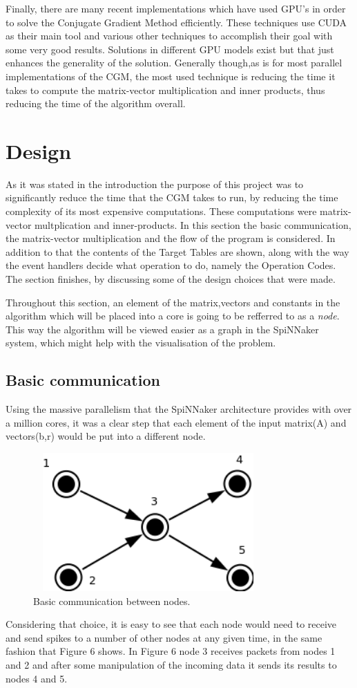 \documentclass[12pt,a4paper]{article}
\begin{document}
Finally, there are many recent implementations which have used GPU's in order to solve the Conjugate Gradient Method efficiently. These techniques use CUDA as their main tool and various other techniques to accomplish their goal with some very good results. Solutions in different GPU models exist but that just enhances the generality of the solution. Generally though,as is for most parallel implementations of the CGM, the most used technique is reducing the time it takes to compute the matrix-vector multiplication and inner products, thus reducing the time of the algorithm overall\cite{galiano2012gpu}\cite{wozniak2010parallel}.
\section{Design}
As it was stated in the introduction the purpose of this project was to significantly reduce the time that the CGM takes to run, by reducing the time complexity of its most expensive computations. These computations were matrix-vector multplication and inner-products. In this section the basic communication, the matrix-vector multiplication and the flow of the program is considered. In addition to that the contents of the Target Tables are shown, along with the way the event handlers decide what operation to do, namely the Operation Codes. The section finishes, by discussing some of the design choices that were made. 

Throughout this section, an element of the matrix,vectors and constants in the algorithm which will be placed into a core is going to be refferred to as a \emph{node}. This way the algorithm will be viewed easier as a graph in the SpiNNaker system, which might help with the visualisation of the problem.

\subsection{Basic communication}
Using the massive parallelism that the SpiNNaker architecture provides with over a million cores, it was a clear step that each element of the input matrix(A) and vectors(b,r) would be put into a different node. 
\begin{figure}[h!]
\includegraphics[width=250pt,height=150pt,scale=2]{Pics/basic.png}
\centering
\caption{Basic communication between nodes.}
\end{figure}
Considering that choice, it is easy to see that each node would need to receive and send spikes to a number of other nodes at any given time, in the same fashion that Figure 6 shows. In Figure 6 node 3 receives packets from nodes 1 and 2 and after some manipulation of the incoming data it sends its results to nodes 4 and 5. 
\end{document}
